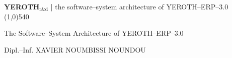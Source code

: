 \documentclass[a4paper, 10pt]{report}
\newcommand{\yerothrd}{\textcolor{yerothColorGreen}
			{\textsc{\textcolor{yerothColorRed}{YEROTH}}$_{\text{r\&d}}$\xspace}}
\newcommand{\yerotherpblack}{YEROTH--ERP--$3.0$\xspace}
\newcommand{\myfullacademicname}{Dipl.--Inf. XAVIER NOUMBISSI NOUNDOU\xspace}
\begin{document}
\thispagestyle{OnlyFirstPage}

{\bf \Large \yerothrd} {| \sc \scriptsize the software--system architecture of \yerotherpblack}
\\ \line(1,0){540}

\vspace{2.0em}

\begin{center}
{\LARGE The Software--System Architecture of \yerotherpblack}
\end{center}

\vspace{2.0em}

\begin{center}
{\large \myfullacademicname}
\end{center}

\vspace{5.0em}



\begingroup
\tableofcontents
\endgroup

\begingroup
\color{medgreen}
\listoffigures
\endgroup

\begingroup
\color{medgreen}
\listoftables
\endgroup

\cleardoublepage













\cleardoublepage



\cleardoublepage
{}
{}
\appendix

\end{document}
